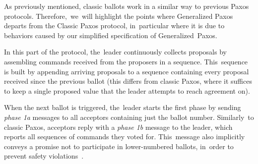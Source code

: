 \documentclass[algorithms,article,accept,moreauthors,pdftex,10pt,a4paper]{Definitions/mdpi}
\begin{document}
As previously mentioned, classic ballots work in a similar way to previous Paxos protocols. Therefore,~we~will highlight the points where Generalized Paxos departs from the Classic Paxos protocol, in~particular where it is due to behaviors caused by our simplified specification of Generalized~Paxos.\par
In this part of the protocol, the~leader continuously collects proposals by assembling commands received from the proposers in a sequence. This~sequence is built by appending arriving proposals to a sequence containing every proposal received since the previous ballot (this differs from classic Paxos, where it suffices to keep a single proposed value that the leader attempts to reach agreement on).\par
When the next ballot is triggered, the~leader starts the first phase by sending \textit{phase 1a} messages to all acceptors containing just the ballot number. Similarly~to classic Paxos, acceptors reply with a \textit{phase 1b} message to the leader, which reports all sequences of commands they voted for. This~message also implicitly conveys a promise not to participate in lower-numbered ballots, in~order to prevent safety violations~\cite{Lamport:1998}.
\end{document}
